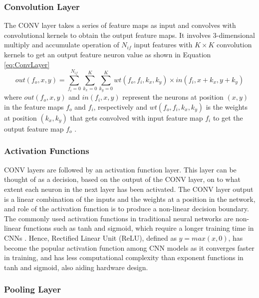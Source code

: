 \documentclass[12pt]{article}
\begin{document}
\subsubsection{Convolution Layer}
\label{sec:Background-CNN-Conv}
\vspace{-12pt}

The CONV layer takes a series of feature maps as input and convolves with convolutional kernels to obtain the output feature maps. It involves 3-dimensional multiply and accumulate operation of $N_{if}$ input features with $K\times K$ convolution kernels to get an output feature neuron value as shown in Equation \ref{eq:ConvLayer}
\begin{equation}
out(f_o,x,y)=\sum^{N_{if}}_{f_i=0} \sum^{K}_{k_x=0} \sum^{K}_{k_y=0} wt(f_o,f_i,k_x,k_y)\times in(f_i,x+k_x,y+k_y)
\label{eq:ConvLayer}
\end{equation}
where $out(f_o,x,y)$ and $in(f_i,x,y)$ represent the neurons at position $(x,y)$ in the feature maps $f_o$ and $f_i$, respectively and $wt(f_o,f_i,k_x,k_y)$ is the weights at position $(k_x,k_y)$ that gets convolved with input feature map $f_i$ to get the output feature map $f_o$ \cite{SudaFpgaAccelerator}.

\subsubsection{Activation Functions}
\label{sec:Background-CNN-Activation}
\vspace{-12pt}

CONV layers are followed by an activation function layer. This layer can be thought of as a decision, based on the output of the CONV layer, on to what extent each neuron in the next layer has been activated. The CONV layer output is a linear combination of the inputs and the weights at a position in the network, and role of the activation function is to produce a non-linear decision boundary. The commonly used activation functions in traditional neural networks are non-linear functions such as tanh and sigmoid, which require a longer training time in CNNs \cite{AlexNet}. Hence, Rectified Linear Unit (ReLU), defined as $y = max(x,0)$, has become the popular activation function among CNN models as it converges faster in training, and has less computational complexity than exponent functions in tanh and sigmoid, also aiding hardware design.

\subsubsection{Pooling Layer}
\label{sec:Background-CNN-Pool}
\vspace{-12pt}
\end{document}
